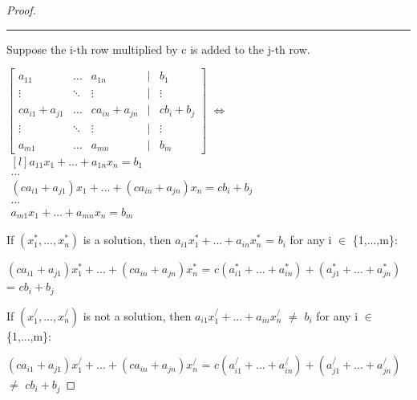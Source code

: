 \begin{proof}
        \rule[0.1cm]{16.7cm}{0.01cm}

        Suppose the i-th row multiplied by c is added to the j-th row.

        \hspace{0.5cm}
        \footnotesize
        $\begin{bmatrix}
            a_{11} & \hdots & a_{1n} & | & b_1 \\
            \vdots & \ddots & \vdots & | & \vdots \\
            ca_{i1}+a_{j1} & \hdots & ca_{in}+a_{jn}
                & | & cb_i+b_j \\
            \vdots & \ddots & \vdots & | & \vdots \\
            a_{m1} & \hdots & a_{mn} & | & b_m
        \end{bmatrix}$
        \hspace{0.5cm}
        $\Leftrightarrow$
        \hspace{0.5cm}
        $\begin{matrix*}[l]
            a_{11}x_1 + \hdots + a_{1n}x_n = b_1 \\
            \hdots \\
            (ca_{i1}+a_{j1})x_1 + \hdots + (ca_{in}+a_{jn})x_n = cb_i+b_j  \\
            \hdots \\
            a_{m1}x_1 + \hdots + a_{mn}x_n = b_m
        \end{matrix*}$
        \normalsize

        \hspace{0.5cm}
        If $(x_1^*,...,x_n^*)$ is a solution,
        then $a_{i1}x_1^* + ... + a_{in}x_n^*$ = $b_i$
        for any i $\in$ \{1,...,m\}:
        
        \hspace{1cm}
        $(ca_{i1}+a_{j1})x_1^* + ... + (ca_{in}+a_{jn})x_n^*$
        = $c(a_{i1}^* + ... + a_{in}^*) + (a_{j1}^* + ... + a_{jn}^*)$
        = $cb_i + b_j$
        
        \hspace{0.5cm}
        If $(x_1^/,...,x_n^/)$ is not a solution,
        then $a_{i1}x_1^/ + ... + a_{in}x_n^/$ $\not =$ $b_i$
        for any i $\in$ \{1,...,m\}:
        
        \hspace{1cm}
        $(ca_{i1}+a_{j1})x_1^/ + ... + (ca_{in}+a_{jn})x_n^/$
        = $c(a_{i1}^/ + ... + a_{in}^/) + (a_{j1}^/ + ... + a_{jn}^/)$
        $\not =$ $cb_i + b_j$


\end{proof}
